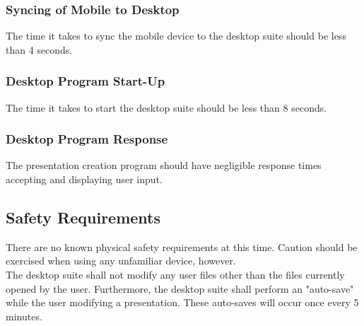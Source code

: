 \documentclass{article}
\begin{document}
\subsubsection{Syncing of Mobile to Desktop}
The time it takes to sync the mobile device to the desktop suite should be less than 4 seconds.

\subsubsection{Desktop Program Start-Up}
The time it takes to start the desktop suite should be less than 8 seconds.

\subsubsection{Desktop Program Response}
The presentation creation program should have negligible response times accepting and displaying user input.

\subsection{Safety Requirements}
There are no known physical safety requirements at this time.  Caution should be exercised when using any unfamiliar device, however.\\

The desktop suite shall not modify any user files other than the files currently opened by the user.
Furthermore, the desktop suite shall perform an "auto-save" while the user modifying a presentation.  These auto-saves will occur once every 5 minutes.
\end{document}
